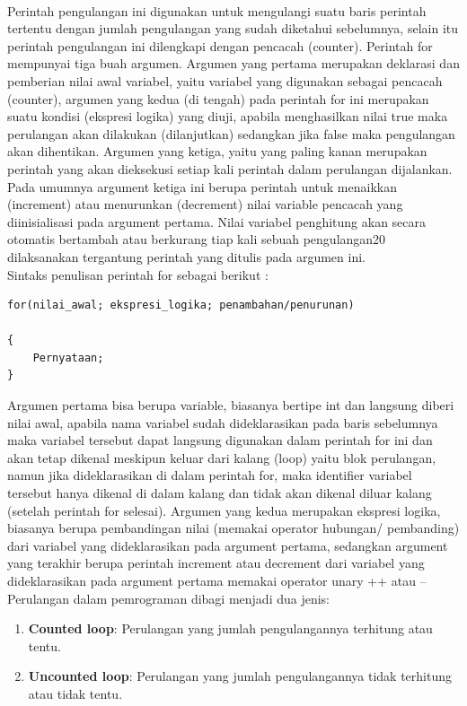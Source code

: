 \documentclass[a4paper,12pt]{article}
\begin{document}
\paragraph{}
Perintah  pengulangan  ini  digunakan  untuk  mengulangi  suatu  baris  perintah 
tertentu  dengan  jumlah  pengulangan  yang  sudah  diketahui  sebelumnya,  selain  itu 
perintah pengulangan ini dilengkapi dengan pencacah (counter). Perintah for mempunyai 
tiga  buah  argumen.  Argumen yang  pertama merupakan  deklarasi  dan  pemberian  nilai 
awal variabel, yaitu variabel yang digunakan sebagai pencacah (counter), argumen yang 
kedua (di tengah) pada perintah for ini merupakan suatu kondisi (ekspresi logika) yang 
diuji,  apabila  menghasilkan  nilai  true  maka  perulangan  akan  dilakukan  (dilanjutkan) 
sedangkan jika false maka pengulangan akan dihentikan. Argumen yang ketiga, yaitu yang 
paling  kanan  merupakan  perintah  yang  akan  dieksekusi  setiap  kali  perintah  dalam 
perulangan  dijalankan.  Pada  umumnya  argument  ketiga  ini  berupa  perintah  untuk 
menaikkan  (increment)  atau  menurunkan  (decrement)  nilai  variable  pencacah  yang 
diinisialisasi  pada  argument  pertama.  Nilai  variabel  penghitung  akan  secara  otomatis
bertambah atau berkurang tiap kali sebuah pengulangan20 dilaksanakan tergantung perintah yang ditulis pada argumen ini. \\
Sintaks penulisan perintah for sebagai berikut :
\begin{lstlisting}[frame=single]
for(nilai_awal; ekspresi_logika; penambahan/penurunan)

{
	Pernyataan;
}
\end{lstlisting}
Argumen pertama bisa berupa variable, biasanya bertipe int dan langsung diberi nilai awal, apabila nama variabel sudah dideklarasikan pada baris sebelumnya maka variabel tersebut dapat langsung digunakan dalam perintah for ini dan akan tetap dikenal meskipun keluar dari kalang (loop) yaitu blok perulangan, namun jika dideklarasikan di dalam perintah for, maka identifier variabel tersebut hanya dikenal di dalam kalang dan tidak akan dikenal diluar kalang (setelah perintah for selesai). Argumen yang kedua merupakan ekspresi logika, biasanya berupa pembandingan nilai (memakai operator hubungan/ pembanding) dari variabel yang dideklarasikan pada argument pertama, sedangkan argument yang terakhir berupa perintah increment atau decrement dari variabel yang dideklarasikan pada argument pertama memakai operator unary ++ atau --
Perulangan dalam pemrograman dibagi menjadi dua jenis:
\begin{enumerate}
	\item \textbf{Counted loop}: Perulangan yang jumlah pengulangannya terhitung atau tentu.
	
	\item \textbf{Uncounted loop}: Perulangan yang jumlah pengulangannya tidak terhitung atau tidak tentu.
	
\end{enumerate}	
\end{document}
